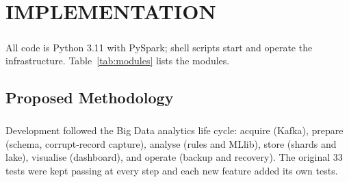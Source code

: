 \chapter{IMPLEMENTATION}

\paragraph{}
All code is Python 3.11 with PySpark; shell scripts start and operate the infrastructure. Table~\ref{tab:modules} lists the modules.

\section{Proposed Methodology}
\paragraph{}
Development followed the Big Data analytics life cycle: acquire (Kafka), prepare (schema, corrupt-record capture), analyse (rules and MLlib), store (shards and lake), visualise (dashboard), and operate (backup and recovery). The original 33 tests were kept passing at every step and each new feature added its own tests.


